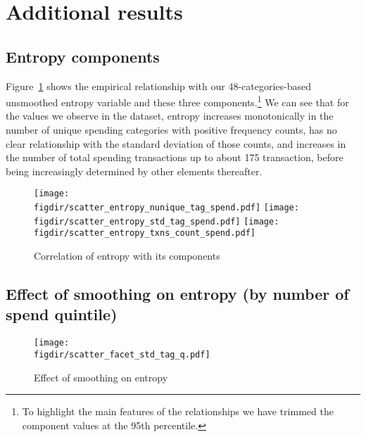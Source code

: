 
\section{Additional results}%
\label{sec:additional_results}

\subsection{Entropy components}%
\label{sub:entropy_components}

Figure~\ref{fig:entropy_components} shows the empirical relationship with our
48-categories-based unsmoothed entropy variable and these three
components.\footnote{To highlight the main features of the relationships we
have trimmed the component values at the 95th percentile.} We can see that for
the values we observe in the dataset, entropy increases monotonically in the
number of unique spending categories with positive frequency counts, has no
clear relationship with the standard deviation of those counts, and increases
in the number of total spending transactions up to about 175 transaction,
before being increasingly determined by other elements thereafter.

\begin{figure}[ht]
    \centering 
    \caption{Correlation of entropy with its components}
    \label{fig:entropy_components}
    \texttt{[image: \\figdir/scatter\_entropy\_nunique\_tag\_spend.pdf]}
    \texttt{[image: \\figdir/scatter\_entropy\_std\_tag\_spend.pdf]}
    \texttt{[image: \\figdir/scatter\_entropy\_txns\_count\_spend.pdf]}
\end{figure}

\subsection{Effect of smoothing on entropy (by number of spend quintile)}%
\label{sub:effect_of_smothing_on_entropy_by_number_of_spend_quintile_}

\begin{figure}[ht]
    \centering 
    \caption{Effect of smoothing on entropy}
    \label{fig:scatter_facets_txns_count_spend_q}
    \texttt{[image: \\figdir/scatter\_facet\_std\_tag\_q.pdf]}
\end{figure}

